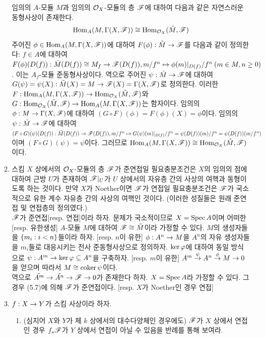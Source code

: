 \begin{enumerate}[label=\tb{5.\arabic*.},itemindent=0mm,itemsep=4mm]
	임의의 $A$-모듈 $M$과 임의의 $\mathcal{O}_X$-모듈의 층 $\mathscr{F}$에 대하여 다음과 같은 자연스러운 동형사상이 존재한다.
	$$\operatorname{Hom}_A(M,\Gamma(X,\mathscr{F}))\cong\operatorname{Hom}_{\mathcal{O}_X}(\tilde M,\mathscr{F})$$
	\nlsol 주어진 $\phi\in\operatorname{Hom}_A(M,\Gamma(X,\mathscr{F}))$에 대하여 $F(\phi):\tilde M\rightarrow\mathscr{F}$를 다음과 같이 정의한다:
	$f\in A$에 대하여 $F(\phi)(D(f)):\tilde M(D(f))\cong M_f\rightarrow\mathscr{F}(D(f)),m/f^n\mapsto\phi(m)|_{D(f)}/f^n\:(m\in M,n\ge0)$.
	이는 $A_f$-모듈 준동형사상이다.
	역으로 주어진 $\psi:\tilde M\rightarrow\mathscr{F}$에 대하여
	$G(\psi)=\psi(X):\tilde M(X)=M\rightarrow\mathscr{F}(X)=\Gamma(X,\mathscr{F})$로 정의한다.
	이러한 $F:\operatorname{Hom}_A(M,\Gamma(X,\mathscr{F}))\rightarrow\operatorname{Hom}_{\mathcal{O}_X}(\tilde M,\mathscr{F})$와
	$G:\operatorname{Hom}_{\mathcal{O}_X}(\tilde M,\mathscr{F})\rightarrow\operatorname{Hom}_A(M,\Gamma(X,\mathscr{F}))$는 함자이다.
	임의의 $\phi:M\rightarrow\Gamma(X,\mathscr{F})$에 대하여 $(G\circ F)(\phi)=F(\phi)(X)=\phi$이다.
	임의의 $\psi:\tilde M\rightarrow\mathscr{F}$에 대하여 $(F\circ G)(\psi)(D(f)):\tilde M(D(f))\rightarrow\mathscr{F}(D(f)),
	m/f^n\mapsto G(\psi)(m)|_{D(f)}/f^n=\psi(D(f))(m)/f^n=\psi(D(f))(m/f^n)$이며 $(F\circ G)(\psi)=\psi$이다.
	그러므로 $\operatorname{Hom}_A(M,\Gamma(X,\mathscr{F}))\cong\operatorname{Hom}_{\mathcal{O}_X}(\tilde M,\mathscr{F})$이다.
	\item 스킴 $X$ 상에서의 $\mathcal{O}_X$-모듈의 층 $\mathscr{F}$가 준연접일 필요충분조건은 $X$의 임의의 점에 대하여 근방 $U$가 존재하여
	$\mathscr{F}|_U$가 $U$ 상에서의 자유층 간의 사상의 여핵과 동형이도록 하는 것이다.
	만약 $X$가 Noether이면 $\mathscr{F}$가 연접일 필요충분조건은 $\mathscr{F}$가 국소적으로 유한 계수 자유층 간의 사상의 여핵인 것이다.
	(이러한 성질들은 원래 준연접 및 연접층의 정의였다.)\\
	\sol $\mathscr{F}$가 준연접[resp. 연접]이라 하자.
	문제가 국소적이므로 $X=\operatorname{Spec} A$이며 어떠한 [resp. 유한생성] $A$-모듈 $M$에 대하여 $\mathscr{F}\cong\tilde M$이라 가정할 수 있다.
	$M$의 생성자들을 $\{m_i:i<n\}$들이라 하자. [resp. $n$이 유한]
	$\phi:A^n\rightarrow M$을 $A^n$의 자유 생성자들을 $m_i$들로 대응시키는 전사 준동형사상으로 정의하자.
	$\ker\varphi$에 대하여 동일 방식으로 $\psi:A^m\rightarrow\ker\varphi\subseteq A^n$을 구축하자. [resp. $m$이 유한]
	$A^m\stackrel{\psi}{\rightarrow} A^n\stackrel{\phi}{\rightarrow} M\rightarrow 0$을 얻으며 따라서 $M\cong\operatorname{coker}\psi$이다.\\
	역으로 $\tilde{A^m}\rightarrow\tilde{A^n}\rightarrow\mathscr{F}\rightarrow 0$가 존재한다 하자. $X=\operatorname{Spec} A$라 가정할 수 있다.
	그 경우 (5.7)에 의해 $\mathscr{F}$가 준연접이다. [resp. $X$가 Noether인 경우 연접]
	\item $f:X\rightarrow Y$가 스킴 사상이라 하자.
	\begin{enumerate}[label=(\alph*)]
	\item (심지어 $X$와 $Y$가 체 $k$ 상에서의 대수다양체인 경우에도)
	$\mathscr{F}$가 $X$ 상에서 연접인 경우 $f_*\mathscr{F}$가 $Y$ 상에서 연접이 아닐 수 있음을 반례를 통해 보여라.

\end{enumerate}
\end{enumerate}
